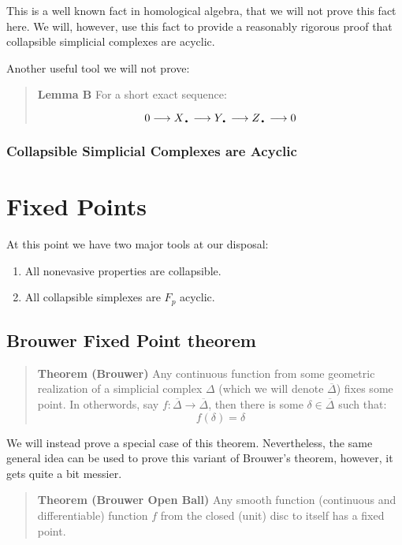 \documentclass[letterpaper,12pt]{article}
\newcommand{\lra}{\longrightarrow}
\newcommand{\tb}{\text{\textbullet}}
\newcommand{\ol}{\overline}
\begin{document}
This is a well known fact in homological algebra, that we will not prove this fact here. We will, however, use this fact to provide a reasonably rigorous proof that collapsible simplicial complexes are acyclic.


Another useful tool we will not prove:

\begin{quote}
    \textbf{Lemma B} For a short exact sequence:

    $$0 \lra X_{\tb} \lra Y_{\tb} \lra Z_{\tb} \lra 0 $$ 

\end{quote}

\subsubsection{Collapsible Simplicial Complexes are Acyclic}

\section{Fixed Points}

At this point we have two major tools at our disposal:

\begin{enumerate}
    \item{
            All nonevasive properties are collapsible.
        }
    \item{
            All collapsible simplexes are $F_p$ acyclic.
        }
\end{enumerate}


\subsection{Brouwer Fixed Point theorem}

\begin{quote}
    \textbf{Theorem (Brouwer)} Any continuous function from some geometric realization of a simplicial complex $\Delta$ (which we will denote $\ol{\Delta}$) fixes some point. In otherwords, say $f : \ol{\Delta} \to \ol{\Delta}$, then there is some $\delta \in \ol{\Delta}$ such that:
    $$f(\delta) = \delta$$
\end{quote}

We will instead prove a special case of this theorem. Nevertheless, the same general idea can be used to prove this variant of Brouwer's theorem, however, it gets quite a bit messier.

\begin{quote}
    \textbf{Theorem (Brouwer Open Ball)} Any smooth function (continuous and differentiable) function $f$ from the closed (unit) disc to itself has a fixed point.
\end{quote}
\end{document}
